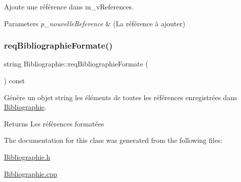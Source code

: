 Ajoute une référence dans m\+\_\+v\+References. 


\begin{DoxyParams}{Parameters}
{\em p\+\_\+nouvelle\+Reference} & (La référence à ajouter) \\
\hline
\end{DoxyParams}
\mbox{\label{classbiblio_1_1Bibliographie_a651e6318bc607af6c3e42f5ce28d66fd}} 
\subsubsection{\texorpdfstring{req\+Bibliographie\+Formate()}{reqBibliographieFormate()}}
{\footnotesize\ttfamily string Bibliographie\+::req\+Bibliographie\+Formate (\begin{DoxyParamCaption}{ }\end{DoxyParamCaption}) const}



Génère un objet string les éléments de toutes les références enregistrées dans \hyperlink{classbiblio_1_1Bibliographie}{Bibliographie}. 

\begin{DoxyReturn}{Returns}
Les références formatées 
\end{DoxyReturn}


The documentation for this class was generated from the following files\+:\begin{DoxyCompactItemize}
\item 
\hyperlink{Bibliographie_8h}{Bibliographie.\+h}\item 
\hyperlink{Bibliographie_8cpp}{Bibliographie.\+cpp}\end{DoxyCompactItemize}
